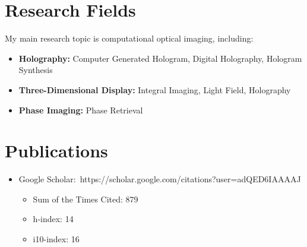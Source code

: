 \documentclass[10pt,a4paper]{moderncv}
\begin{document}
\section{Research Fields}
My main research topic is computational optical imaging, including:
\begin{itemize}
	\item \textbf{Holography:} Computer Generated Hologram, Digital Holography, Hologram Synthesis
	\item \textbf{Three-Dimensional Display:} Integral Imaging, Light Field, Holography
	\item \textbf{Phase Imaging:} Phase Retrieval
\end{itemize}

\section{Publications}
\vspace{3pt}
\begin{itemize}
	\vspace{3pt}
	\item Google Scholar:~{https://scholar.google.com/citations?user=adQED6IAAAAJ}
	\begin{itemize}
		\item Sum of the Times Cited: 879
		\item h-index: 14
		\item i10-index: 16
	\end{itemize}
\end{itemize}

\end{document}
